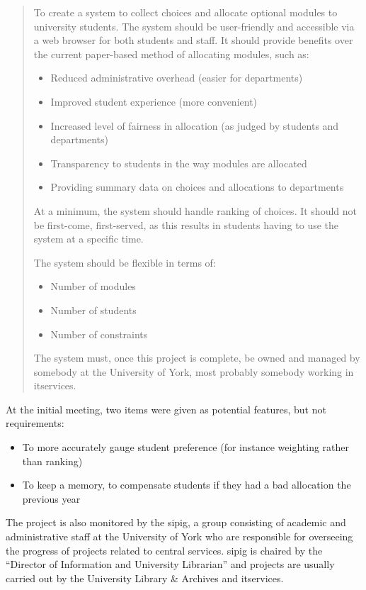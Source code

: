 \begin{quote}
  To create a system to collect choices and allocate optional modules to
  university students. The system should be user-friendly and accessible via a
  web browser for both students and staff. It should provide benefits over the
  current paper-based method of allocating modules, such as:
  
  \begin{itemize}
    \item Reduced administrative overhead (easier for departments)
    \item Improved student experience (more convenient)
    \item Increased level of fairness in allocation (as judged by students and departments)
    \item Transparency to students in the way modules are allocated
    \item Providing summary data on choices and allocations to departments
  \end{itemize}
  
  At a minimum, the system should handle ranking of choices. It should not be
  first-come, first-served, as this results in students having to use the
  system at a specific time.
  
  The system should be flexible in terms of:
  
  \begin{itemize}
    \item Number of modules
    \item Number of students
    \item Number of constraints
  \end{itemize}
  
  The system must, once this project is complete, be owned and managed by
  somebody at the University of York, most probably somebody working in
  \gls{itservices}.
  
\end{quote}

At the initial meeting, two items were given as potential features, but not
requirements:

\begin{itemize}
  \item To more accurately gauge student preference (for instance weighting rather than ranking)
  \item To keep a memory, to compensate students if they had a bad allocation the previous year
\end{itemize}

The project is also monitored by the \gls{sipig}, a group consisting of
academic and administrative staff at the University of York who are
responsible for overseeing the progress of projects related to central
services. \gls{sipig} is chaired by the ``Director of Information and
University Librarian'' and projects are usually carried out by the University
Library \& Archives and \gls{itservices}.
